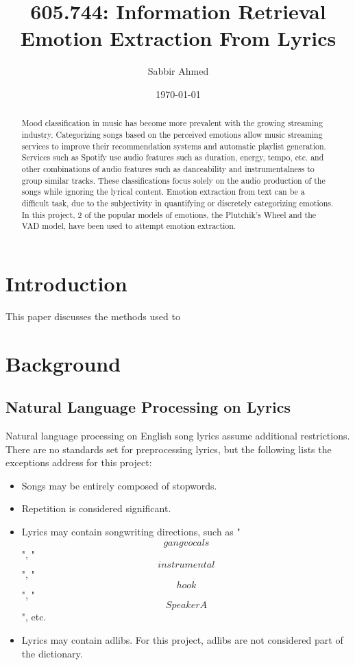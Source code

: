 \documentclass[11pt]{article}
\title{605.744: Information Retrieval \\ Emotion Extraction From Lyrics}
\author{Sabbir Ahmed}
\date{\today}
\begin{document}
\maketitle
\tableofcontents
\clearpage
\newpage

\begin{abstract}
  \noindent Mood classification in music has become more prevalent with the growing streaming industry. Categorizing songs based on the perceived emotions allow music streaming services to improve their recommendation systems and automatic playlist generation. Services such as Spotify use audio features such as duration, energy, tempo, etc. and other combinations of audio features such as danceability and instrumentalness to group similar tracks. These classifications focus solely on the audio production of the songs while ignoring the lyrical content. Emotion extraction from text can be a difficult task, due to the subjectivity in quantifying or discretely categorizing emotions. In this project, 2 of the popular models of emotions, the Plutchik's Wheel and the VAD model, have been used to attempt emotion extraction.
\end{abstract}

\section{Introduction}
This paper discusses the methods used to

\section{Background}

\subsection{Natural Language Processing on Lyrics}

Natural language processing on English song lyrics assume additional restrictions. There are no standards set for preprocessing lyrics, but the following lists the exceptions address for this project:
\begin{itemize}
  \item Songs may be entirely composed of stopwords.
  \item Repetition is considered significant.
  \item Lyrics may contain songwriting directions, such as "\[gang vocals\]", "\[instrumental\]", "\[hook\]", "\[Speaker A\]", etc.
  \item Lyrics may contain adlibs. For this project, adlibs are not considered part of the dictionary.
\end{itemize}
\end{document}
